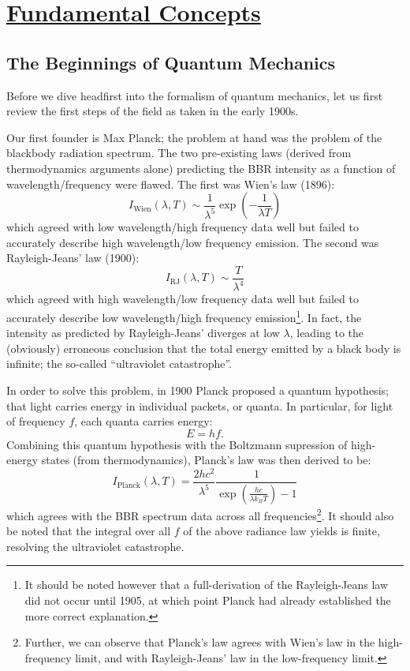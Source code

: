 \section[Fundamental Concepts]{\hyperlink{toc}{Fundamental Concepts}}
\subsection{The Beginnings of Quantum Mechanics}
Before we dive headfirst into the formalism of quantum mechanics, let us first review the first steps of the field as taken in the early 1900s. 

Our first founder is Max Planck; the problem at hand was the problem of the blackbody radiation spectrum. The two pre-existing laws (derived from thermodynamics arguments alone) predicting the BBR intensity as a function of wavelength/frequency were flawed. The first was Wien's law (1896):
\begin{equation}
    I_{\text{Wien}}(\lambda, T) \sim \frac{1}{\lambda^5}\exp(-\frac{1}{\lambda T}) %
\end{equation}
which agreed with low wavelength/high frequency data well but failed to accurately describe high wavelength/low frequency emission. The second was Rayleigh-Jeans' law (1900):
\begin{equation}
    I_{\text{RJ}}(\lambda, T) \sim \frac{T}{\lambda^4} %
\end{equation}
which agreed with high wavelength/low frequency data well but failed to accurately describe low wavelength/high frequency emission\footnote{It should be noted however that a full-derivation of the Rayleigh-Jeans law did not occur until 1905, at which point Planck had already established the more correct explanation.}. In fact, the intensity as predicted by Rayleigh-Jeans' diverges at low $\lambda$, leading to the (obviously) erroneous conclusion that the total energy emitted by a black body is infinite; the so-called ``ultraviolet catastrophe''.

In order to solve this problem, in 1900 Planck proposed a quantum hypothesis; that light carries energy in individual packets, or quanta. In particular, for light of frequency $f$, each quanta carries energy:
\begin{equation}
    E = hf.
\end{equation}
Combining this quantum hypothesis with the Boltzmann supression of high-energy states (from thermodynamics), Planck's law was then derived to be:
\begin{equation}
    I_{\text{Planck}}(\lambda, T) = \frac{2hc^2}{\lambda^5}\frac{1}{\exp(\frac{hc}{\lambda k_B T}) - 1}
\end{equation}
which agrees with the BBR spectrum data across all frequencies\footnote{Further, we can observe that Planck's law agrees with Wien's law in the high-frequency limit, and with Rayleigh-Jeans' law in the low-frequency limit.}. It should also be noted that the integral over all $f$ of the above radiance law yields is finite, resolving the ultraviolet catastrophe. 

